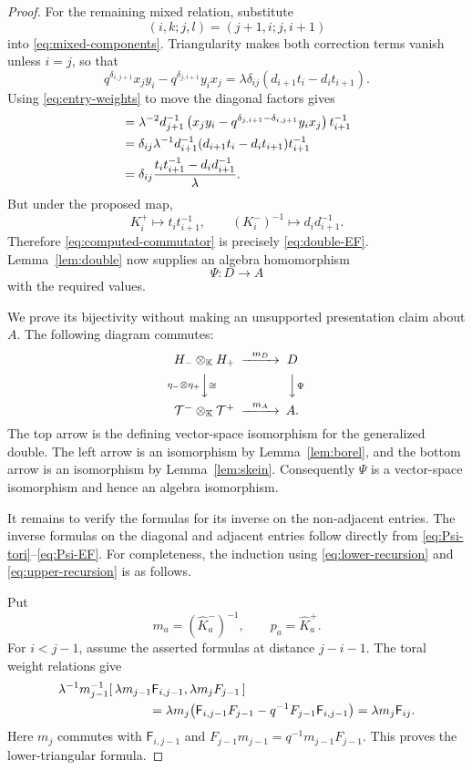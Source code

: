 \documentclass[11pt]{article}
\theoremstyle{remark}
\newcommand{\kk}{\mathbb{K}}
\begin{document}
\begin{proof}
For the remaining mixed relation, substitute
\[
 (i,k;j,l)=(j+1,i;j,i+1)
\]
into \eqref{eq:mixed-components}.  Triangularity makes both
correction terms vanish unless $i=j$, so that
\begin{equation}\label{eq:simple-mixed}
 q^{\delta_{i,j+1}}x_jy_i
 -q^{\delta_{j,i+1}}y_ix_j
 =\lambda\delta_{ij}(d_{i+1}t_i-d_it_{i+1}).
\end{equation}
Using \eqref{eq:entry-weights} to move the diagonal factors gives
\begin{align}
 [\mathcal E_i,\mathcal F_j]
 &=
 \lambda^{-2}d_{j+1}^{-1}
 \left(
   x_jy_i
   -q^{\delta_{j,i+1}-\delta_{i,j+1}}y_ix_j
 \right)t_{i+1}^{-1}
 \notag\\
 &=
 \delta_{ij}\lambda^{-1}
       d_{i+1}^{-1}(d_{i+1}t_i-d_it_{i+1})t_{i+1}^{-1}
 \notag\\
 &=\delta_{ij}\frac{
          t_it_{i+1}^{-1}-d_id_{i+1}^{-1}
        }{\lambda}.
 \label{eq:computed-commutator}
\end{align}
But under the proposed map,
\[
 K_i^+\longmapsto t_it_{i+1}^{-1},
 \qquad
 (K_i^-)^{-1}\longmapsto d_id_{i+1}^{-1}.
\]
Therefore \eqref{eq:computed-commutator} is precisely
\eqref{eq:double-EF}.  Lemma~\ref{lem:double} now supplies an
algebra homomorphism
\[
 \Psi:D\longrightarrow A
\]
with the required values.

We prove its bijectivity without making an unsupported
presentation claim about $A$.  The following diagram commutes:
\[
\begin{CD}
 H_-\otimes_\kk H_+ @>{m_D}>> D\\
 @V{\eta_-\otimes\eta_+}V{\cong}V @VV{\Psi}V\\
 \mathcal T^-\otimes_\kk\mathcal T^+
       @>{m_A}>> A .
\end{CD}
\]
The top arrow is the defining vector-space isomorphism for the
generalized double.  The left arrow is an isomorphism by
Lemma~\ref{lem:borel}, and the bottom arrow is an isomorphism by
Lemma~\ref{lem:skein}.  Consequently $\Psi$ is a vector-space
isomorphism and hence an algebra isomorphism.

It remains to verify the formulas for its inverse on the
non-adjacent entries.  The inverse formulas on the diagonal and
adjacent entries follow directly from
\eqref{eq:Psi-tori}--\eqref{eq:Psi-EF}.  For completeness, the
induction using \eqref{eq:lower-recursion} and
\eqref{eq:upper-recursion} is as follows.

Put
\[
 m_a=(\widehat K_a^-)^{-1},
 \qquad p_a=\widehat K_a^+.
\]
For $i<j-1$, assume the asserted formulas at distance $j-i-1$.
The toral weight relations give
\[
 \begin{split}
 &\lambda^{-1}m_{j-1}^{-1}
   [\,\lambda m_{j-1}\mathsf F_{i,j-1},
      \lambda m_jF_{j-1}\,]\\
 &\hspace{25mm}
 =\lambda m_j
    \bigl(\mathsf F_{i,j-1}F_{j-1}
            -q^{-1}F_{j-1}\mathsf F_{i,j-1}\bigr)
 =\lambda m_j\mathsf F_{ij}.
 \end{split}
\]
Here $m_j$ commutes with $\mathsf F_{i,j-1}$ and
$F_{j-1}m_{j-1}=q^{-1}m_{j-1}F_{j-1}$.
This proves the lower-triangular formula.


\end{proof}
\end{document}
